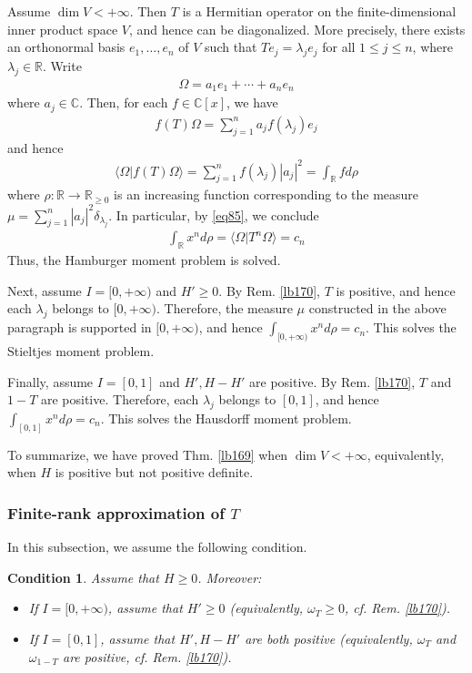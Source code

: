 \documentclass[12pt,b5paper,notitlepage]{article}
\theoremstyle{definition}
\theoremstyle{plain}
\newtheorem{cond}[df]{Condition}
\newcommand{\bk}[1]{\langle {#1}\rangle}
\newcommand{\Cbb}{\mathbb C}
\newcommand{\Rbb}{\mathbb R}
\numberwithin{equation}{section}
\begin{document}
Assume $\dim V<+\infty$. Then $T$ is a Hermitian operator on the finite-dimensional inner product space $V$, and hence can be diagonalized. More precisely, there exists an orthonormal basis $e_1,\dots,e_n$ of $V$ such that $Te_j=\lambda_je_j$ for all $1\leq j\leq n$, where $\lambda_j\in\Rbb$. Write
\begin{align*}
\Omega=a_1e_1+\cdots+a_ne_n
\end{align*}
where $a_j\in\Cbb$. Then, for each $f\in\Cbb[x]$, we have
\begin{align*}
f(T)\Omega=\sum_{j=1}^n a_jf(\lambda_j)e_j
\end{align*}
and hence
\begin{align*}
\bk{\Omega|f(T)\Omega}=\sum_{j=1}^n f(\lambda_j)|a_j|^2=\int_\Rbb fd\rho
\end{align*}
where $\rho:\Rbb\rightarrow\Rbb_{\geq0}$ is an increasing function corresponding to the measure $\mu=\sum_{j=1}^n |a_j|^2\delta_{\lambda_j}$. In particular, by \eqref{eq85}, we conclude
\begin{align*}
\int_\Rbb x^nd\rho=\bk{\Omega|T^n\Omega}=c_n
\end{align*}
Thus, the Hamburger moment problem is solved.

Next, assume $I=[0,+\infty)$ and $H'\geq0$. By Rem. \ref{lb170}, $T$ is positive, and hence each $\lambda_j$ belongs to $[0,+\infty)$. Therefore, the measure $\mu$ constructed in the above paragraph is supported in $[0,+\infty)$, and hence $\int_{[0,+\infty)}x^nd\rho=c_n$. This solves the Stieltjes moment problem.

Finally, assume $I=[0,1]$ and $H',H-H'$ are positive. By Rem. \ref{lb170}, $T$ and $1-T$ are positive. Therefore, each $\lambda_j$ belongs to $[0,1]$, and hence $\int_{[0,1]}x^nd\rho=c_n$. This solves the Hausdorff moment problem.

To summarize, we have proved Thm. \ref{lb169} when $\dim V<+\infty$, equivalently, when $H$ is positive but not positive definite.





\subsubsection{Finite-rank approximation of $T$}\label{lb285}


In this subsection, we assume the following condition.

\begin{cond}\label{lb178}
Assume that $H\geq0$. Moreover:
\begin{itemize}
\item If $I=[0,+\infty)$, assume that $H'\geq0$ (equivalently, $\omega_T\geq0$, cf. Rem. \ref{lb170}).
\item If $I=[0,1]$, assume that $H',H-H'$ are both positive (equivalently, $\omega_T$ and $\omega_{1-T}$ are positive, cf. Rem. \ref{lb170}). 
\end{itemize}
\end{cond}
\end{document}
